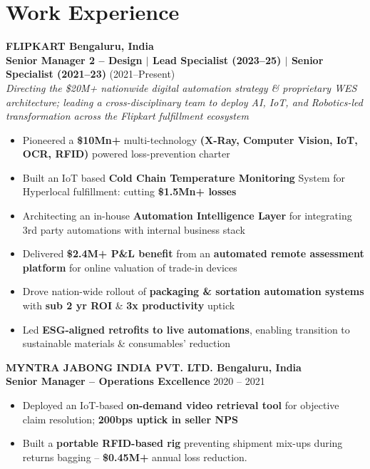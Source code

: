 \documentclass[a4paper,10.5in,13pt]{article}
\begin{document}
\section{Work Experience}

\textbf{FLIPKART \hfill Bengaluru, India}\\[3pt]
\textbf{Senior Manager 2 – Design $|$ Lead Specialist (2023--25) $|$ Senior Specialist (2021--23)} \hfill (2021--Present)\\
\textit{Directing the \$20M+ nationwide digital automation strategy \& proprietary WES architecture; leading a cross-disciplinary team to deploy AI, IoT, and Robotics-led transformation across the Flipkart fulfillment ecosystem}

\begin{itemize}[leftmargin=0.5em,label={--},itemsep=0pt,topsep=0pt,parsep=0pt,partopsep=0pt]
    \item Pioneered a \textbf{\$10Mn+} multi-technology \textbf{(X-Ray, Computer Vision, IoT, OCR, RFID)} powered loss-prevention charter
    \item Built an IoT based \textbf{Cold Chain Temperature Monitoring} System for Hyperlocal fulfillment: cutting \textbf{\$1.5Mn+ losses}
    \item Architecting an in-house \textbf{Automation Intelligence Layer} for integrating 3rd party automations with internal business stack
    \item Delivered \textbf{\$2.4M+ P\&L benefit} from an \textbf{automated remote assessment platform} for online valuation of trade-in devices
    \item Drove nation-wide rollout of \textbf{packaging \& sortation automation systems} with \textbf{sub 2 yr ROI} \& \textbf{3x productivity} uptick
    \item Led \textbf{ESG-aligned retrofits to live automations}, enabling transition to sustainable materials \& consumables' reduction
\end{itemize}

\textbf{MYNTRA JABONG INDIA PVT. LTD. \hfill Bengaluru, India}\\
\textbf{Senior Manager – Operations Excellence} \hfill 2020 -- 2021
\begin{itemize}[leftmargin=0.5em,label={--},itemsep=0pt,topsep=0pt,parsep=0pt,partopsep=0pt]
    \item Deployed an IoT-based \textbf{on-demand video retrieval tool} for objective claim resolution; \textbf{200bps uptick in seller NPS}
    \item Built a \textbf{portable RFID-based rig} preventing shipment mix-ups during returns bagging -- \textbf{\$0.45M+} annual loss reduction.
\end{itemize}
\end{document}
